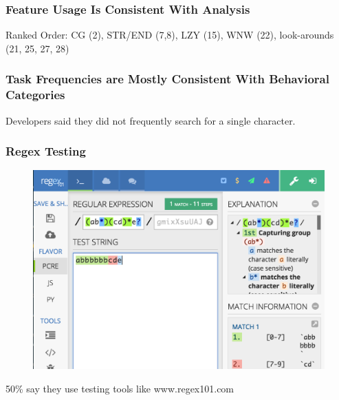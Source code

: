 \begin{frame}
\frametitle{Feature Usage Is Consistent With Analysis}

\begin{center}
Ranked Order: CG (2), STR/END (7,8), LZY (15), WNW (22), look-arounds (21, 25, 27, 28)
\end{center}
\end{frame}


\begin{frame}
\frametitle{Task Frequencies are Mostly Consistent With Behavioral Categories}

\begin{center}
Developers said they did not frequently search for a single character.
\end{center}
\end{frame}


\begin{frame}
\frametitle{Regex Testing}

\begin{figure}[ht]
  \includegraphics[scale=0.35]{nontex/regex101}
  \label{fig:regex101}
\end{figure}
\begin{center}
50\% say they use testing tools like www.regex101.com
\end{center}
\end{frame}

